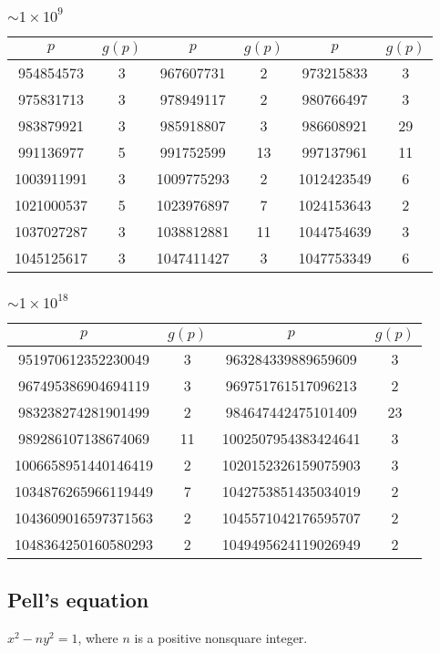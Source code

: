 \subsubsection{$\sim 1 \times 10^9$}

  \begin{tabular}{|c|c|c|c|c|c|}
  \hline
  $p$ & $g(p)$ & $p$ & $g(p)$ & $p$ & $g(p)$ \\ \hline
954854573 & 3 & 967607731 & 2 & 973215833 & 3 \\
975831713 & 3 & 978949117 & 2 & 980766497 & 3 \\
983879921 & 3 & 985918807 & 3 & 986608921 & 29 \\
991136977 & 5 & 991752599 & 13 & 997137961 & 11 \\
1003911991 & 3 & 1009775293 & 2 & 1012423549 & 6 \\
1021000537 & 5 & 1023976897 & 7 & 1024153643 & 2 \\
1037027287 & 3 & 1038812881 & 11 & 1044754639 & 3 \\
1045125617 & 3 & 1047411427 & 3 & 1047753349 & 6 \\
  \hline
  \end{tabular}

\subsubsection{$\sim 1 \times 10^{18}$}

  \begin{tabular}{|c|c|c|c|}
  \hline
  $p$ & $g(p)$ & $p$ & $g(p)$ \\ \hline
951970612352230049 & 3 & 963284339889659609 & 3 \\
967495386904694119 & 3 & 969751761517096213 & 2 \\
983238274281901499 & 2 & 984647442475101409 & 23 \\
989286107138674069 & 11 & 1002507954383424641 & 3 \\
1006658951440146419 & 2 & 1020152326159075903 & 3 \\
1034876265966119449 & 7 & 1042753851435034019 & 2 \\
1043609016597371563 & 2 & 1045571042176595707 & 2 \\
1048364250160580293 & 2 & 1049495624119026949 & 2 \\
  \hline
  \end{tabular}

\subsection{Pell's equation}
$x^2 - ny^2 = 1$, where $n$ is a positive nonsquare integer.

